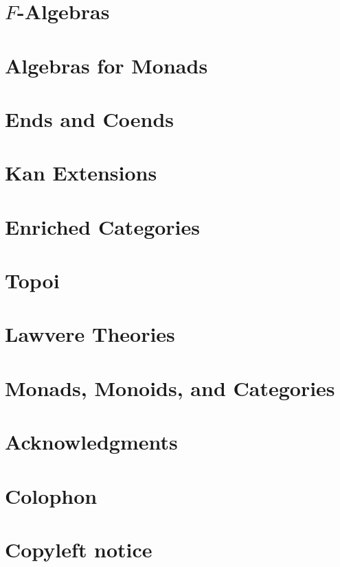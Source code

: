 \chapter{$F$-Algebras}\label{f-algebras}


\chapter{Algebras for Monads}\label{algebras-for-monads}


\chapter{Ends and Coends}\label{ends-and-coends}


\chapter{Kan Extensions}\label{kan-extensions}


\chapter{Enriched Categories}\label{enriched-categories}


\chapter{Topoi}\label{topoi}


\chapter{Lawvere Theories}\label{lawvere-theories}


\chapter{Monads, Monoids, and Categories}\label{monads-monoids-categories}


\backmatter

\appendix
{}


\makeatletter\@openrightfalse
\chapter*{Acknowledgments}\label{acknowledgments}


\chapter*{Colophon}\label{colophon}


\chapter*{Copyleft notice}\label{copyleft}

\@openrighttrue\makeatother
\afterpage{\blankpage}
